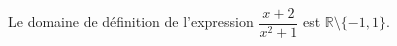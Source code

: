 Le domaine de définition de l'expression $\dfrac{x+2}{x^2+1}$ est $\mathbb R \setminus \{-1,1\}$.

\begin{reponses}
\end{reponses}


